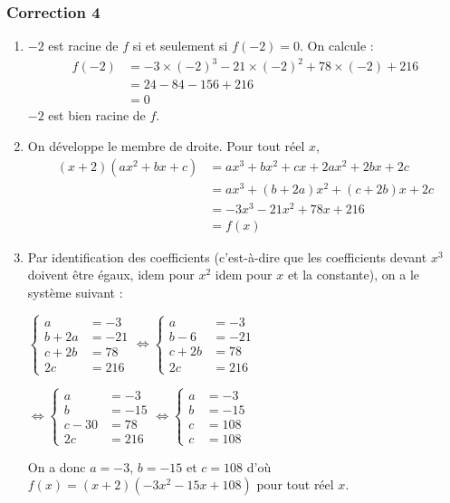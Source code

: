 \documentclass[15pt, mathserif]{beamer}
\begin{document}
\begin{frame}
\vspace{-10mm}
	\frametitle{Correction 4}
\bigskip 
 \begin{enumerate} 
 	 \item $-2$ est racine de $f$ si et seulement si $f(-2)=0$. On calcule : 
 	 	 \begin{align*}f(-2)&= -3 \times \left(-2\right)^3 -21 \times \left(-2\right)^2+78\times \left(-2\right)+216 \\ 
 &= 24-84-156+216 \\ 
 &= 0 
 	  \end{align*} 
  $-2$ est bien racine de $f$. 
 	 \item On développe le membre de droite. Pour tout réel $x$, 
 	 \begin{align*} (x+2)(ax^2+bx+c) 
 &= ax^3+bx^2+cx+2ax^2+2bx+2c \\ 
   &= ax^3 +(b+2a)x^2+(c+2b)x+2c \\ 
 &= -3x^3-21x^2+78x+216\\ 
 &= f(x)
 \end{align*} 
 
 \end{enumerate}
 \end{frame} 
 \begin{frame} 
 \begin{enumerate} 
 \setcounter{enumi}{2} 
 	 \item Par identification des coefficients (c'est-à-dire que les coefficients devant $x^3$ doivent être égaux, idem pour $x^2$ idem pour $x$ et la constante), on a le système suivant : 
 
 \hfil $\begin{cases} 
 a &=-3 \\ 
  b+2a &=-21 \\ 
  c+2b &= 78 \\ 
  2c &= 216 
 \end{cases} 
 \Longleftrightarrow 
 \begin{cases} a &=-3 \\ 
 b-6&=-21 \\ 
  c+2b &= 78 \\ 
  2c &= 216 
 \end{cases} $ 
 
 \hfil $ \Longleftrightarrow 
 \begin{cases} a &=-3 \\ 
 b &=-15 \\ 
  c-30 &= 78 \\ 
  2c &= 216 
 \end{cases} 
  \Longleftrightarrow 
 \begin{cases}  a &=-3 \\ 
 b &=-15 \\ 
  c &= 108 \\ 
  c &= 108 
 \end{cases}$ 
 
 On a donc $a=-3$, $b=-15$ et $c=108$ d'où $f(x)=(x+2)(-3x^2-15x+108)$ pour tout réel $x$. 
 \end{enumerate}
 \end{frame} 
\end{document}

